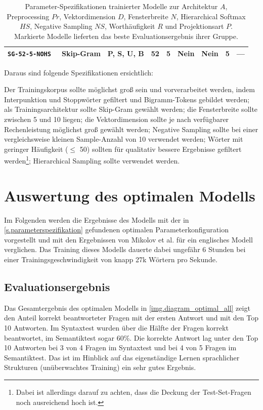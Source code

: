 \begin{table}[!ht]
\begin{tabular}{|l|l|l|c|c|c|c|c|c|}
\tt{SG-52-5-NOHS} & Skip-Gram & P, S, U, B & 52  & 5  & Nein & Nein & 5  & ---    \\ \hline
\end{tabular}
\caption[Parameter-Spezifikationen trainierter Modelle nach Evaluation]{\label{tab.bestparameter}Parameter-Spezifikationen trainierter Modelle zur Architektur $A$, Preprocessing $Pr$, Vektordimension $D$, Fensterbreite $N$, Hierarchical Softmax $HS$, Negative Sampling $NS$, Worthäufigkeit $R$ und Projektionsart $P$. Markierte Modelle lieferten das beste Evaluationsergebnis ihrer Gruppe.}
\vspace{1ex}\end{table}

Daraus sind folgende Spezifikationen ersichtlich:

Der Trainingskorpus sollte möglichst groß sein und vorverarbeitet werden, indem Interpunktion und Stoppwörter gefiltert und Bigramm-Tokens gebildet werden; als Trainingsarchitektur sollte Skip-Gram gewählt werden; die Fensterbreite sollte zwischen 5 und 10 liegen; die Vektordimension sollte je nach verfügbarer Rechenleistung möglichst groß gewählt werden; Negative Sampling sollte bei einer vergleichsweise kleinen Sample-Anzahl von 10 verwendet werden; Wörter mit geringer Häufigkeit ($\leq$ 50) sollten für qualitativ bessere Ergebnisse gefiltert werden\footnote{Dabei ist allerdings darauf zu achten, dass die Deckung der Test-Set-Fragen noch ausreichend hoch ist.}; Hierarchical Sampling sollte verwendet werden.

\section{Auswertung des optimalen Modells}\label{s.optimalesmodell}
Im Folgenden werden die Ergebnisse des Modells mit der in \autoref{s.parameterspezifikation} gefundenen optimalen Parameterkonfiguration vorgestellt und mit den Ergebnissen von Mikolov et al. \citep{Mikolov2012} für ein englisches Modell verglichen. Das Training dieses Modells dauerte dabei ungefähr 6 Stunden bei einer Trainingsgeschwindigkeit von knapp 27k Wörtern pro Sekunde.

\subsection{Evaluationsergebnis}\label{ss.evaluationsergebnis}

Das Gesamtergebnis des optimalen Modells in \autoref{img.diagram_optimal_all} zeigt den Anteil korrekt beantworteter Fragen mit der ersten Antwort und mit den Top 10 Antworten. Im Syntaxtest wurden über die Hälfte der Fragen korrekt beantwortet, im Semantiktest sogar 60\%. Die korrekte Antwort lag unter den Top 10 Antworten bei 3 von 4 Fragen im Syntaxtest und bei 4 von 5 Fragen im Semantiktest. Das ist im Hinblick auf das eigenständige Lernen sprachlicher Strukturen (unüberwachtes Training) ein sehr gutes Ergebnis.

